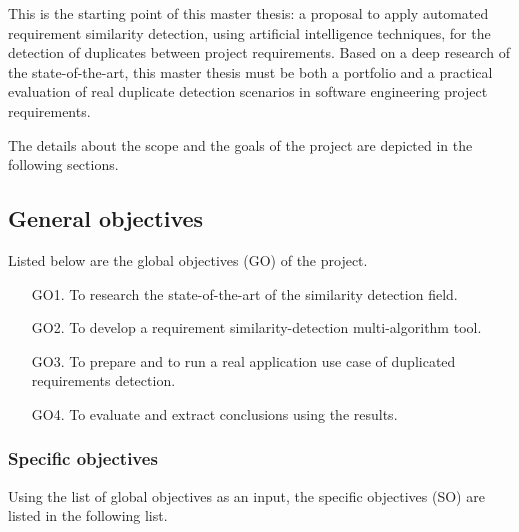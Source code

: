 \documentclass[a4paper]{article}
\begin{document}
This is the starting point of this master thesis: a proposal to apply automated requirement similarity detection, using artificial intelligence techniques, for the detection of duplicates between project requirements. Based on a deep research of the state-of-the-art, this master thesis must be both a portfolio and a practical evaluation of real duplicate detection scenarios in software engineering project requirements. 

The details about the scope and the goals of the project are depicted in the following sections.

\subsection{General objectives}
\label{sec:main_objectives}

Listed below are the global objectives (GO) of the project.

\begin{enumerate}
\item[GO1.] To research the state-of-the-art of the similarity detection field. 
\item[GO2.] To develop a requirement similarity-detection multi-algorithm tool.
\item[GO3.] To prepare and to run a real application use case of duplicated requirements detection.
\item[GO4.] To evaluate and extract conclusions using the results.
\end{enumerate}

\subsubsection{Specific objectives}
\label{sec:spec_objectives}

Using the list of global objectives as an input, the specific objectives (SO) are listed in the following list.
\end{document}
